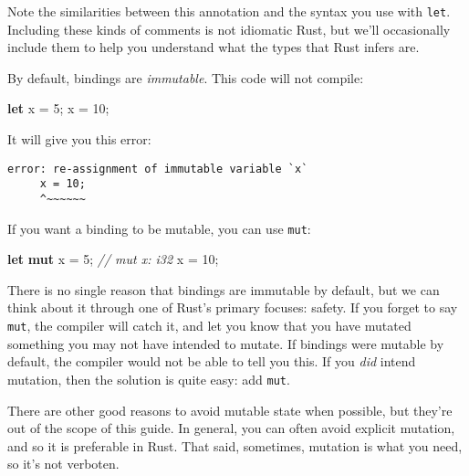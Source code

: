 \documentclass[a4paper,]{book}
\newenvironment{Shaded}{\begin{snugshade}}{\end{snugshade}}
\newcommand{\KeywordTok}[1]{\textcolor[rgb]{0.13,0.29,0.53}{\textbf{{#1}}}}
\newcommand{\DecValTok}[1]{\textcolor[rgb]{0.00,0.00,0.81}{{#1}}}
\newcommand{\CommentTok}[1]{\textcolor[rgb]{0.56,0.35,0.01}{\textit{{#1}}}}
\newcommand{\NormalTok}[1]{{#1}}
\begin{document}
Note the similarities between this annotation and the syntax you use
with \texttt{let}. Including these kinds of comments is not idiomatic
Rust, but we'll occasionally include them to help you understand what
the types that Rust infers are.


By default, bindings are \emph{immutable}. This code will not compile:

\begin{Shaded}
\begin{Highlighting}[]
\KeywordTok{let} \NormalTok{x = }\DecValTok{5}\NormalTok{;}
\NormalTok{x = }\DecValTok{10}\NormalTok{;}
\end{Highlighting}
\end{Shaded}

It will give you this error:

\begin{verbatim}
error: re-assignment of immutable variable `x`
     x = 10;
     ^~~~~~~
\end{verbatim}

If you want a binding to be mutable, you can use \texttt{mut}:

\begin{Shaded}
\begin{Highlighting}[]
\KeywordTok{let} \KeywordTok{mut} \NormalTok{x = }\DecValTok{5}\NormalTok{; }\CommentTok{// mut x: i32}
\NormalTok{x = }\DecValTok{10}\NormalTok{;}
\end{Highlighting}
\end{Shaded}

There is no single reason that bindings are immutable by default, but we
can think about it through one of Rust's primary focuses: safety. If you
forget to say \texttt{mut}, the compiler will catch it, and let you know
that you have mutated something you may not have intended to mutate. If
bindings were mutable by default, the compiler would not be able to tell
you this. If you \emph{did} intend mutation, then the solution is quite
easy: add \texttt{mut}.

There are other good reasons to avoid mutable state when possible, but
they're out of the scope of this guide. In general, you can often avoid
explicit mutation, and so it is preferable in Rust. That said,
sometimes, mutation is what you need, so it's not verboten.
\end{document}
